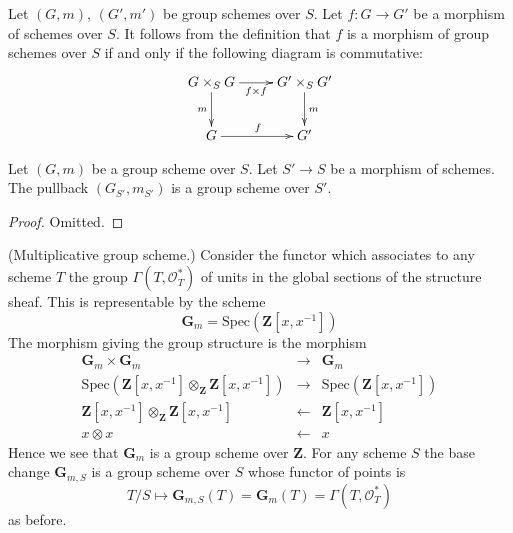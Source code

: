 \medskip\noindent
Let $(G, m)$, $(G', m')$ be group schemes over $S$.
Let $f : G \to G'$ be a morphism of schemes over $S$.
It follows from the definition that $f$ is a morphism
of group schemes over $S$ if and only if the following diagram
is commutative:
$$
\xymatrix{
G \times_S G \ar[r]_-{f \times f} \ar[d]_m &
G' \times_S G' \ar[d]^m \\
G \ar[r]^f & G'
}
$$

\begin{lemma}
\label{lemma-base-change-group-scheme}
Let $(G, m)$ be a group scheme over $S$.
Let $S' \to S$ be a morphism of schemes.
The pullback $(G_{S'}, m_{S'})$ is a group scheme over $S'$.
\end{lemma}

\begin{proof}
Omitted.
\end{proof}

\begin{example}
\label{example-multiplicative-group}
(Multiplicative group scheme.)
Consider the functor which associates
to any scheme $T$ the group $\Gamma(T, \mathcal{O}_T^*)$
of units in the global sections of the structure sheaf.
This is representable by the scheme
$$
\mathbf{G}_m = \text{Spec}(\mathbf{Z}[x, x^{-1}])
$$
The morphism giving the group structure is the morphism
\begin{eqnarray*}
\mathbf{G}_m \times \mathbf{G}_m & \to & \mathbf{G}_m \\
\text{Spec}(\mathbf{Z}[x, x^{-1}] \otimes_{\mathbf{Z}} \mathbf{Z}[x, x^{-1}])
& \to &
\text{Spec}(\mathbf{Z}[x, x^{-1}]) \\
\mathbf{Z}[x, x^{-1}] \otimes_{\mathbf{Z}} \mathbf{Z}[x, x^{-1}]
& \leftarrow &
\mathbf{Z}[x, x^{-1}] \\
x \otimes x & \leftarrow & x
\end{eqnarray*}
Hence we see that $\mathbf{G}_m$ is a group scheme over $\mathbf{Z}$.
For any scheme $S$ the base change $\mathbf{G}_{m, S}$ is a
group scheme over $S$ whose functor of points is
$$
T/S
\longmapsto
\mathbf{G}_{m, S}(T) = \mathbf{G}_m(T) = \Gamma(T, \mathcal{O}_T^*)
$$
as before.
\end{example}

